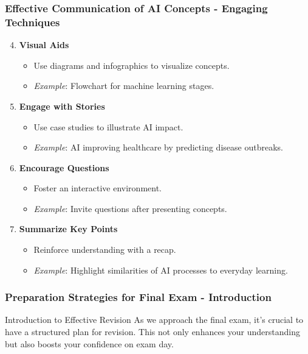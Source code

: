 \documentclass{beamer}
\begin{document}
\begin{frame}[fragile]
    \frametitle{Effective Communication of AI Concepts - Engaging Techniques}
    \begin{enumerate}
        \setcounter{enumi}{3}
        \item \textbf{Visual Aids}
        \begin{itemize}
            \item Use diagrams and infographics to visualize concepts.
            \item \textit{Example}: Flowchart for machine learning stages.
        \end{itemize}

        \item \textbf{Engage with Stories}
        \begin{itemize}
            \item Use case studies to illustrate AI impact.
            \item \textit{Example}: AI improving healthcare by predicting disease outbreaks.
        \end{itemize}

        \item \textbf{Encourage Questions}
        \begin{itemize}
            \item Foster an interactive environment.
            \item \textit{Example}: Invite questions after presenting concepts.
        \end{itemize}
        
        \item \textbf{Summarize Key Points}
        \begin{itemize}
            \item Reinforce understanding with a recap.
            \item \textit{Example}: Highlight similarities of AI processes to everyday learning.
        \end{itemize}
    \end{enumerate}
\end{frame}

\begin{frame}[fragile]
    \frametitle{Preparation Strategies for Final Exam - Introduction}
    \begin{block}{Introduction to Effective Revision}
        As we approach the final exam, it's crucial to have a structured plan for revision. This not only enhances your understanding but also boosts your confidence on exam day.
    \end{block}
\end{frame}
\end{document}

